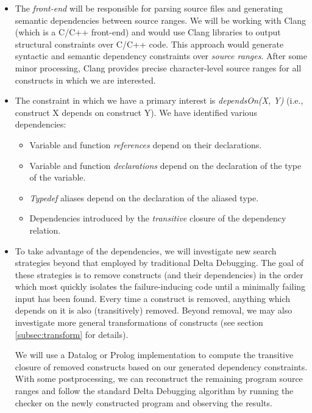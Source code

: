 \documentclass[11pt]{article}
\begin{document}
\begin{itemize}
\item The \emph{front-end} will be responsible for parsing source files and
  generating semantic dependencies between source ranges. We will be working
  with Clang \citep{clang} (which is a C/C++ front-end) and would use Clang libraries to
  output structural constraints over C/C++ code.  This approach would generate
  syntactic and semantic dependency constraints over \emph{source ranges}.  After
  some minor processing, Clang provides precise character-level source ranges for
  all constructs in which we are interested.

\item The constraint in which we have a primary interest is \emph{dependsOn(X,
  Y)} (i.e., construct X depends on construct Y).  We have identified various
  dependencies:

\begin{itemize}
\item{Variable and function \emph{references} depend on their declarations.}
\item{Variable and function \emph{declarations} depend on the declaration of the
  type of the variable.}
\item{\emph{Typedef} aliases depend on the declaration of the aliased type.}
\item{Dependencies introduced by the \emph{transitive} closure of the dependency
  relation.
}
\end{itemize}

\item To take advantage of the dependencies, we will investigate new search
  strategies beyond that employed by traditional Delta Debugging.  The goal of
  these strategies is to remove constructs (and their dependencies) in the order
  which most quickly isolates the failure-inducing code until a minimally
  failing input has been found.  Every time a construct is removed, anything
  which depends on it is also (transitively) removed.  Beyond removal, we may
  also investigate more general transformations of constructs (see section
  \ref{subsec:transform} for details).


  We will use a Datalog or Prolog implementation to compute the transitive
  closure of removed constructs based on our generated dependency constraints.
  With some postprocessing, we can reconstruct the remaining program source
  ranges and follow the standard Delta Debugging algorithm by running the
  checker on the newly constructed program and observing the results.

\end{itemize}
\end{document}

